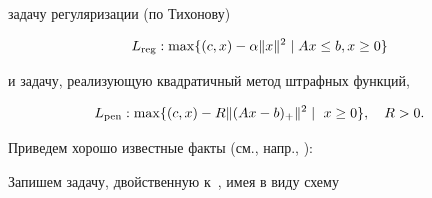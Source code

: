 задачу регуляризации (по Тихонову)


\begin{equation}


\label{f10}


L_{\reg}: \max \{(c,x) -\alpha \| x\|^2 \mid Ax\leq b, x\ge 0 \}


\end{equation}


и задачу, реализующую квадратичный метод штрафных функций,


\begin{equation}


\label{f11}


L_{\pen}: \max \{ (c, x) -R \| (Ax-b)_+ \|^2 \mid\


x\geq 0\},\quad R>0.


\end{equation}


Приведем хорошо известные факты (см., напр., \cite{2}):


\medskip










Запишем задачу, двойственную к~, имея в виду схему


